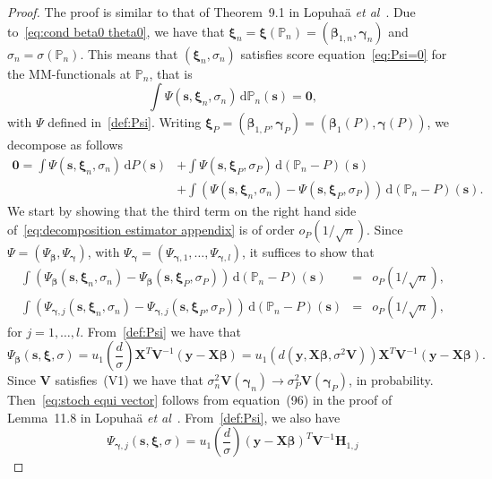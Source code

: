 \documentclass{article}
\numberwithin{equation}{section}
\theoremstyle{plain}
\newcommand{\dd}{\mathrm{d}}
\newcommand{\bbeta}{\bm\beta}
\newcommand{\bxi}{\bm\xi}
\newcommand{\bgamma}{\bm\gamma}
\newcommand{\by}{\mathbf{y}}
\newcommand{\bs}{\mathbf{s}}
\newcommand{\bX}{\mathbf{X}}
\newcommand{\bV}{\mathbf{V}}
\newcommand{\bH}{\mathbf{H}}
\begin{document}
\begin{proof}
The proof is similar to that of Theorem~9.1 in Lopuha\"a \textit{et al}~\cite{lopuhaa-gares-ruizgazen2023}.
Due to~\eqref{eq:cond beta0 theta0}, we have that $\bxi_n=\bxi(\mathbb{P}_n)=(\bbeta_{1,n},\bgamma_{n})$ and $\sigma_n=\sigma(\mathbb{P}_n)$.
This means that $(\bxi_n,\sigma_n)$ satisfies score equation~\eqref{eq:Psi=0} for the MM-functionals at $\mathbb{P}_n$, that is
\[
\int \Psi(\bs,\bxi_n,\sigma_n)\,\dd \mathbb{P}_n(\bs)=\mathbf{0},
\]
with $\Psi$ defined in~\eqref{def:Psi}.
Writing $\bxi_P=(\bbeta_{1,P},\bgamma_P)=(\bbeta_1(P),\bgamma(P))$, we decompose as follows
\begin{equation}
\label{eq:decomposition estimator appendix}
\begin{split}
\mathbf{0}=
\int \Psi(\mathbf{s},\bxi_n,\sigma_n)\,\dd P(\mathbf{s})
&+
\int \Psi(\mathbf{s},\bxi_P,\sigma_P)\,\dd (\mathbb{P}_n-P)(\mathbf{s})\\
&+
\int
\left(
\Psi(\mathbf{s},\bxi_n,\sigma_n)-\Psi(\mathbf{s},\bxi_P,\sigma_P)
\right)
\,\dd (\mathbb{P}_n-P)(\mathbf{s}).
\end{split}
\end{equation}
We start by showing that the third term on the right hand side of~\eqref{eq:decomposition estimator appendix}
is of order $o_P(1/\sqrt{n})$.
Since $\Psi=(\Psi_{\bbeta},\Psi_{\bgamma})$, with $\Psi_{\bgamma}=(\Psi_{\bgamma,1},\ldots,\Psi_{\bgamma,l})$,
it suffices to show that
\begin{eqnarray}
\int
\left(
\Psi_{\bbeta}(\bs,\bxi_n,\sigma_n)-\Psi_{\bbeta}(\bs,\bxi_P,\sigma_P)
\right)
\,\dd (\mathbb{P}_n-P)(\bs)
&=&\label{eq:stoch equi vector}
o_P(1/\sqrt{n}),
\\
\int
\left(
\Psi_{\bgamma,j}(\bs,\bxi_n,\sigma_n)-\Psi_{\bgamma,j}(\bs,\bxi_P,\sigma_P)
\right)
\,\dd (\mathbb{P}_n-P)(\bs)
&=&\label{eq:stoch equi matrix}
o_P(1/\sqrt{n}),
\end{eqnarray}
for $j=1,\ldots,l$.
From~\eqref{def:Psi} we have that
\[
\Psi_{\bbeta}(\bs,\bxi,\sigma)
=
u_1\left(
\frac{d}{\sigma}\right)\bX^T\bV^{-1}(\by-\bX\bbeta)
=
u_1\left(d(\by,\bX\bbeta,\sigma^2\bV)\right)\bX^T\bV^{-1}(\by-\bX\bbeta).
\]
Since $\bV$ satisfies~(V1) we have that $\sigma_n^2\bV(\bgamma_n)\to \sigma_P^2\bV(\bgamma_P)$, in probability.
Then~\eqref{eq:stoch equi vector} follows from equation~(96) in the proof of Lemma~11.8 in Lopuha\"a \emph{et al}~\cite{supplement}.
From~\eqref{def:Psi}, we also have
\[
\Psi_{\bgamma,j}(\bs,\bxi,\sigma)
=
u_1\left(\frac{d}{\sigma}\right)
(\by-\bX\bbeta)^T\bV^{-1}
\bH_{1,j}
\]
\end{proof}
\end{document}
